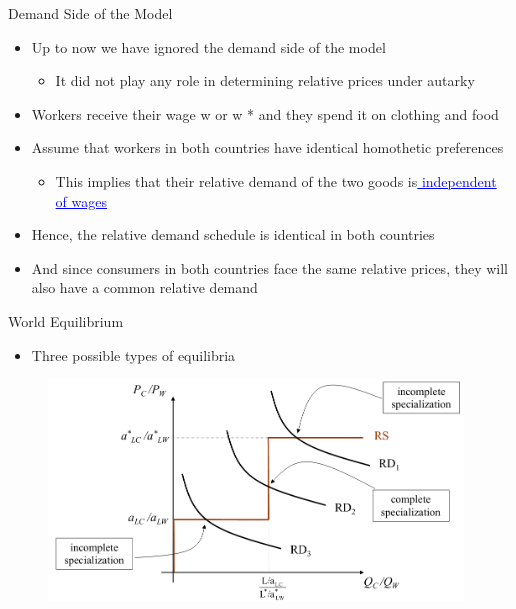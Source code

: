 \documentclass[10pt,hyperref={CJKbookmarks=true},xcolor=dvipsnames,aspectratio=169]{beamer}
\begin{document}
\begin{frame}{Demand Side of the Model }

\begin{itemize}
\item Up to now we have ignored the demand side of the model 

\begin{itemize}
\item It did not play any role in determining relative prices under autarky 
\end{itemize}
\item Workers receive their wage w or w {*} and they spend it on clothing
and food 
\item Assume that workers in both countries have identical homothetic preferences 

\begin{itemize}
\item This implies that their relative demand of the two goods is\textcolor{blue}{\uline{
independent of wages }}
\end{itemize}
\item Hence, the relative demand schedule is identical in both countries 
\item And since consumers in both countries face the same relative prices,
they will also have a common relative demand 
\end{itemize}
\end{frame}

\begin{frame}{World Equilibrium}

\begin{itemize}
\item Three possible types of equilibria
\end{itemize}

\begin{figure}
\centering{}\includegraphics[width=11cm]{fig/ricardo/lec3-08}
\end{figure}


\end{frame}
\end{document}
